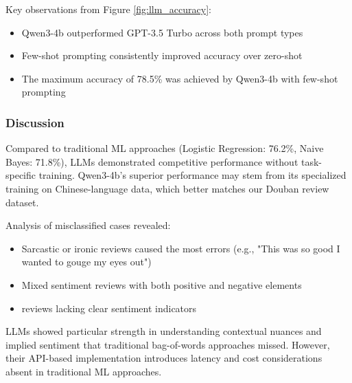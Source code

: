 \documentclass{article}
\begin{document}
Key observations from Figure \ref{fig:llm_accuracy}:
\begin{itemize}
    \item Qwen3-4b outperformed GPT-3.5 Turbo across both prompt types
    \item Few-shot prompting consistently improved accuracy over zero-shot
    \item The maximum accuracy of 78.5\% was achieved by Qwen3-4b with few-shot prompting
\end{itemize}

\subsubsection{Discussion}
\label{sssec:discussion}

Compared to traditional ML approaches (Logistic Regression: 76.2\%, Naive Bayes: 71.8\%), LLMs demonstrated competitive performance without task-specific training. Qwen3-4b's superior performance may stem from its specialized training on Chinese-language data, which better matches our Douban review dataset.

Analysis of misclassified cases revealed:
\begin{itemize}
    \item Sarcastic or ironic reviews caused the most errors (e.g., "This was so good I wanted to gouge my eyes out")
    \item Mixed sentiment reviews with both positive and negative elements
    \item reviews lacking clear sentiment indicators
\end{itemize}

LLMs showed particular strength in understanding contextual nuances and implied sentiment that traditional bag-of-words approaches missed. However, their API-based implementation introduces latency and cost considerations absent in traditional ML approaches.
\end{document}
